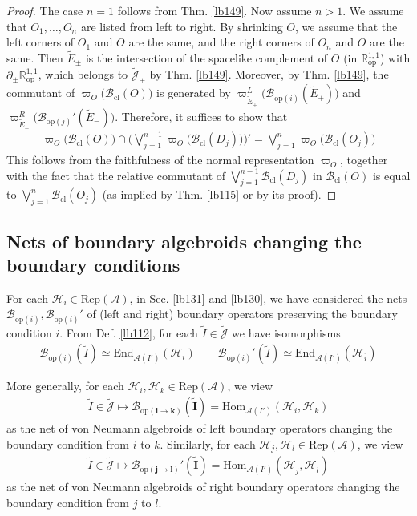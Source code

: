 \documentclass[11pt,b5paper,notitlepage]{article}
\theoremstyle{definition}
\theoremstyle{plain}
\newcommand{\wtd}{\widetilde}
\newcommand{\ovl}{\overline}
\newcommand{\End}{\mathrm{End}} %
\newcommand{\Hom}{\mathrm{Hom}}
\newcommand{\Jtd}{\widetilde{\mathcal J}}
\newcommand{\RepA}{\mathrm{Rep}(\mathcal A)}
\newcommand{\MA}{\mathcal A}
\newcommand{\MH}{\mathcal H}
\newcommand{\Rop}{\mathbb R^{1,1}_{\mathrm{op}}}
\newcommand{\Bcl}{\mathcal B_{\mathrm{cl}}}
\newcommand{\Bop}[1]{\mathcal B_{\mathrm{op}({#1})}}
\newcommand{\Bopi}{\mathcal B_{\mathrm{op}(i)}}
\newcommand{\Bopj}{\mathcal B_{\mathrm{op}(j)}}
\numberwithin{equation}{section}
\begin{document}
\begin{proof}
The case $n=1$ follows from Thm. \ref{lb149}. Now assume $n>1$. We assume that $O_1,\dots,O_n$ are listed from left to right. By shrinking $O$, we assume that the left corners of $O_1$ and $O$ are the same, and the right corners of $O_n$ and $O$ are the same. Then $\wtd E_\pm$ is the intersection of the spacelike complement of $ O$ (in $\Rop$) with $\partial_\pm\Rop$, which belongs to $\Jtd_\pm$ by Thm. \ref{lb149}. Moreover, by Thm. \ref{lb149}, the commutant of $\varpi_{ O}\big(\Bcl( O)\big)$ is generated by $\varpi^L_{\wtd E_+}\big(\Bopi(\wtd E_+)\big)$ and $\varpi^R_{\wtd E_-}\big(\Bopj'(\wtd E_-)\big)$. Therefore, it suffices to show that
\begin{align*}
\varpi_{ O}\big(\Bcl( O)\big)\cap\Big(\bigvee_{j=1}^{n-1}\varpi_{ O}\big(\Bcl({D_j})\big)\Big)'=\bigvee_{j=1}^n\varpi_{ O}\big(\Bcl({O_j})\big)
\end{align*}
This follows from the faithfulness of the normal representation $\varpi_{ O}$, together with the fact that the relative commutant of $\bigvee_{j=1}^{n-1}\Bcl({D_j})$ in $\Bcl( O)$ is equal to $\bigvee_{j=1}^n\Bcl({O_j})$ (as implied by Thm. \ref{lb115} or by its proof).
\end{proof}








\subsection{Nets of boundary algebroids changing the boundary conditions}\label{lb156}


For each $\MH_i\in\RepA$, in Sec. \ref{lb131} and \ref{lb130}, we have considered the nets $\Bopi,\Bopi'$ of (left and right) boundary operators preserving the boundary condition $i$. From Def. \ref{lb112}, for each $\wtd I\in\Jtd$ we have isomorphisms
\begin{align*}
\Bopi(\wtd I)\simeq\End_{\MA(I')}(\MH_i)\qquad \Bopi'(\wtd I)\simeq\End_{\MA(I')}(\MH_{\ovl i})
\end{align*}

More generally, for each $\MH_i,\MH_k\in\RepA$, we view
\begin{align*}
\wtd I\in\Jtd\mapsto\pmb{\Bop{i\rightarrow k}(\wtd I)}=\Hom_{\MA(I')}(\MH_i,\MH_k)
\end{align*}
as the net of von Neumann algebroids of left boundary operators changing the boundary condition from $i$ to $k$. Similarly, for each $\MH_j,\MH_l\in\RepA$, we view
\begin{align*}
\wtd I\in\Jtd\mapsto\pmb{\Bop{j\rightarrow l}'(\wtd I)}=\Hom_{\MA(I')}(\MH_{\ovl j},\MH_{\ovl l})
\end{align*}
as the net of von Neumann algebroids of right boundary operators changing the boundary condition from $j$ to $l$.
\end{document}
